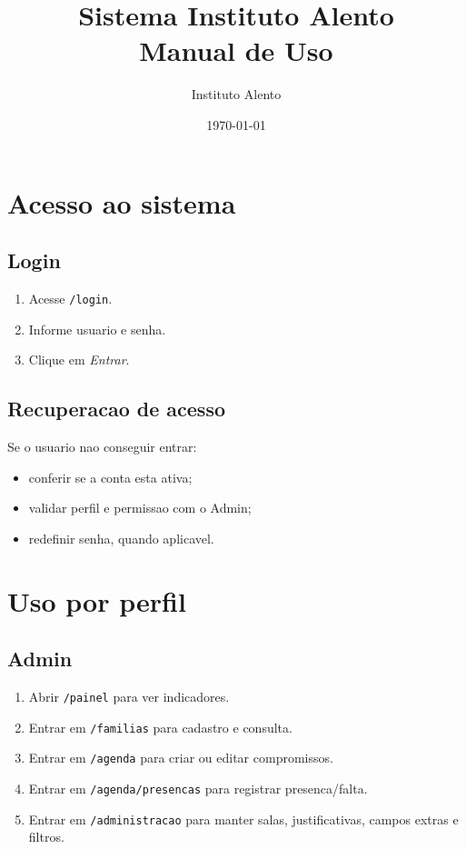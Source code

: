 \documentclass[12pt,a4paper]{article}
\title{Sistema Instituto Alento \\ Manual de Uso}
\author{Instituto Alento}
\date{\today}
\begin{document}
\maketitle
\tableofcontents
\newpage

\section{Acesso ao sistema}
\subsection{Login}
\begin{enumerate}
\item Acesse \texttt{/login}.
\item Informe usuario e senha.
\item Clique em \textit{Entrar}.
\end{enumerate}

\subsection{Recuperacao de acesso}
Se o usuario nao conseguir entrar:
\begin{itemize}[leftmargin=*]
\item conferir se a conta esta ativa;
\item validar perfil e permissao com o Admin;
\item redefinir senha, quando aplicavel.
\end{itemize}

\section{Uso por perfil}
\subsection{Admin}
\begin{enumerate}
\item Abrir \texttt{/painel} para ver indicadores.
\item Entrar em \texttt{/familias} para cadastro e consulta.
\item Entrar em \texttt{/agenda} para criar ou editar compromissos.
\item Entrar em \texttt{/agenda/presencas} para registrar presenca/falta.
\item Entrar em \texttt{/administracao} para manter salas, justificativas, campos extras e filtros.
\end{enumerate}
\end{document}

